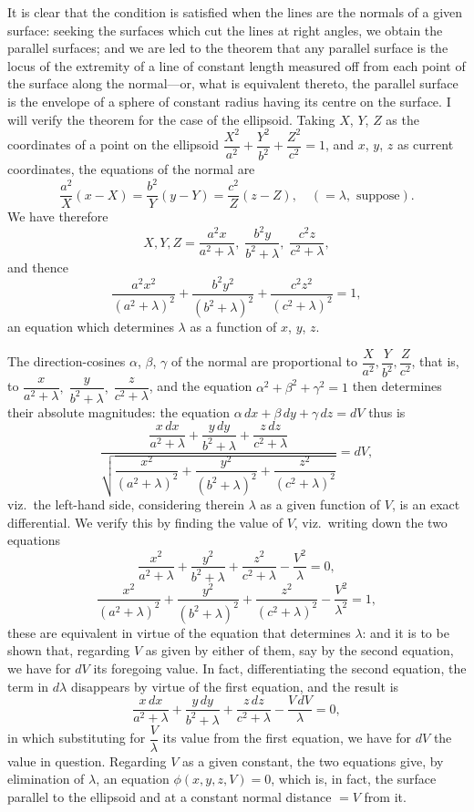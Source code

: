\documentclass[11pt]{article}
\begin{document}
It is clear that the condition is satisfied when the lines are the normals of a given surface: seeking the surfaces which cut the lines at right angles, we obtain the parallel surfaces; and we are led to the theorem that any parallel surface is the locus of the extremity of a line of constant length measured off from each point of the surface along the normal---or, what is equivalent thereto, the parallel surface is the envelope of a sphere of constant radius having its centre on the surface. I will verify the theorem for the case of the ellipsoid. Taking $X$, $Y$, $Z$ as the coordinates of a point on the ellipsoid $\dfrac{X^2}{a^2} + \dfrac{Y^2}{b^2} + \dfrac{Z^2}{c^2} = 1$, and $x$, $y$, $z$ as current coordinates, the equations of the normal are
\[
\dfrac{a^2}{X}(x - X) = \dfrac{b^2}{Y}(y - Y) = \dfrac{c^2}{Z}(z - Z),\quad (=\lambda,\text{ suppose}).
\]
We have therefore
\[
X, Y, Z = \dfrac{a^2 x}{a^2 + \lambda},\;\dfrac{b^2 y}{b^2 + \lambda},\;\dfrac{c^2 z}{c^2 + \lambda},
\]
and thence
\[
\dfrac{a^2 x^2}{(a^2 + \lambda)^2} + \dfrac{b^2 y^2}{(b^2 + \lambda)^2} + \dfrac{c^2 z^2}{(c^2 + \lambda)^2} = 1,
\]
an equation which determines $\lambda$ as a function of $x$, $y$, $z$.

The direction-cosines $\alpha$, $\beta$, $\gamma$ of the normal are proportional to $\dfrac{X}{a^2}, \dfrac{Y}{b^2}, \dfrac{Z}{c^2}$, that is, to $\dfrac{x}{a^2 + \lambda},\;\dfrac{y}{b^2 + \lambda},\;\dfrac{z}{c^2 + \lambda}$, and the equation $\alpha^2 + \beta^2 + \gamma^2 = 1$ then determines their absolute magnitudes: the equation $\alpha\,dx + \beta\,dy + \gamma\,dz = dV$ thus is
\[
\dfrac{\dfrac{x\,dx}{a^2 + \lambda} + \dfrac{y\,dy}{b^2 + \lambda} + \dfrac{z\,dz}{c^2 + \lambda}}{\sqrt{\dfrac{x^2}{(a^2 + \lambda)^2} + \dfrac{y^2}{(b^2 + \lambda)^2} + \dfrac{z^2}{(c^2 + \lambda)^2}}} = dV,
\]
viz.\ the left-hand side, considering therein $\lambda$ as a given function of $V$, is an exact differential. We verify this by finding the value of $V$, viz.\ writing down the two equations
\[
\dfrac{x^2}{a^2 + \lambda} + \dfrac{y^2}{b^2 + \lambda} + \dfrac{z^2}{c^2 + \lambda} - \dfrac{V^2}{\lambda} = 0,
\]
\[
\dfrac{x^2}{(a^2 + \lambda)^2} + \dfrac{y^2}{(b^2 + \lambda)^2} + \dfrac{z^2}{(c^2 + \lambda)^2} - \dfrac{V^2}{\lambda^2} = 1,
\]
these are equivalent in virtue of the equation that determines $\lambda$: and it is to be shown that, regarding $V$ as given by either of them, say by the second equation, we have for $dV$ its foregoing value. In fact, differentiating the second equation, the term in $d\lambda$ disappears by virtue of the first equation, and the result is
\[
\dfrac{x\,dx}{a^2 + \lambda} + \dfrac{y\,dy}{b^2 + \lambda} + \dfrac{z\,dz}{c^2 + \lambda} - \dfrac{V\,dV}{\lambda} = 0,
\]
in which substituting for $\dfrac{V}{\lambda}$ its value from the first equation, we have for $dV$ the value in question. Regarding $V$ as a given constant, the two equations give, by elimination of $\lambda$, an equation $\phi(x, y, z, V) = 0$, which is, in fact, the surface parallel to the ellipsoid and at a constant normal distance $= V$ from it.
\end{document}

